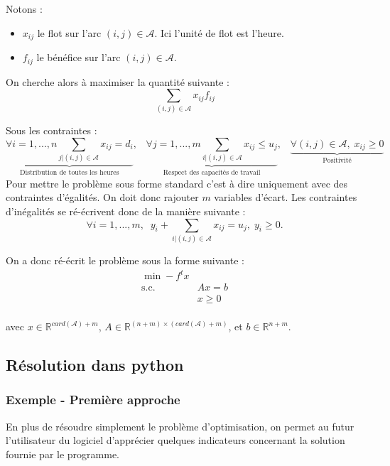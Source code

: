 \documentclass[12pt]{article}
\begin{document}
Notons :
\begin{itemize}
\item $x_{ij}$ le flot sur l'arc $(i,j) \in \mathcal{A}$. Ici l'unité de flot est l'heure.
\item $f_{ij}$ le bénéfice sur l'arc $(i,j) \in \mathcal{A}$.\\
\end{itemize}



On cherche alors à maximiser la quantité suivante :
\[
\sum_{(i,j) \in \mathcal{A}} x_{ij}f_{ij} 
\]

Sous les contraintes :
\[
\underbrace{\forall i = 1,...,n  \sum_{j| (i,j) \in \mathcal{A}} x_{ij} = d_i}_{\text{Distribution de toutes les heures}}
 , \;\;\;
\underbrace{\forall j = 1,...,m  \sum_{i| (i,j) \in \mathcal{A}} x_{ij} \leq u_j}_{\text{Respect des capacités de travail}},\;\;\;
\underbrace{\forall (i,j) \in \mathcal{A},\; x_{ij} \geq 0}_{\text{Positivité}}
\]
Pour mettre le problème sous forme standard c'est à dire uniquement avec des contraintes d'égalités. On doit donc rajouter $m$ variables d'écart. Les contraintes d'inégalités se ré-écrivent donc de la manière suivante : \\


\[
\forall i = 1,...,m, \;\; y_i + \sum_{i| (i,j) \in \mathcal{A}} x_{ij} = u_j, \; y_i \geq 0. 
\]




On a donc ré-écrit le problème sous la forme suivante :
\begin{equation}
\begin{aligned}
\min -f^{t}x\\
\textrm{s.c.} \; \; & Ax = b\\
              & x \geq 0    \\
\end{aligned}
\end{equation}

avec $x \in \mathbb{R}^{card(\mathcal{A}) + m} $, $A \in\mathbb{R}^{(n+m) \times (card(\mathcal{A}) + m)} $, et $b \in\mathbb{R}^{n+m} $.

\newpage
\subsection{Résolution dans python}
\subsubsection{Exemple - Première approche}
En plus de résoudre simplement le problème d'optimisation, on permet au futur l'utilisateur du logiciel d'apprécier quelques indicateurs concernant la solution fournie par le programme.
\end{document}
